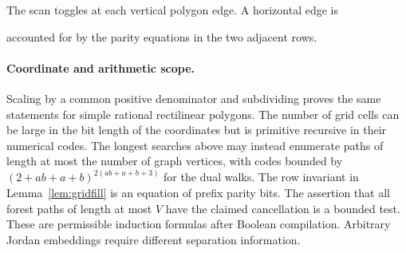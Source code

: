 \begin{center}

{\small The scan toggles at each vertical polygon edge. A horizontal edge is\par
 accounted for by the parity equations in the two adjacent rows.}
\end{center}

\paragraph{Coordinate and arithmetic scope.}
Scaling by a common positive denominator and subdividing proves the same statements for simple rational rectilinear polygons. The number of grid cells can be large in the bit length of the coordinates but is primitive recursive in their numerical codes. The longest searches above may instead enumerate paths of length at most the number of graph vertices, with codes bounded by $(2+ab+a+b)^{2(ab+a+b+3)}$ for the dual walks. The row invariant in Lemma~\ref{lem:gridfill} is an equation of prefix parity bits. The assertion that all forest paths of length at most $V$ have the claimed cancellation is a bounded test. These are permissible induction formulas after Boolean compilation. Arbitrary Jordan embeddings require different separation information.

